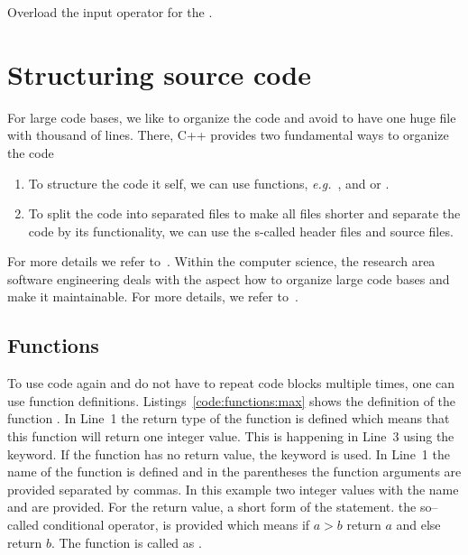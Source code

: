 \begin{exercise}
Overload the input operator \cpp{>>} for the .
\end{exercise}

\section{Structuring source code}
For large code bases, we like to organize the code and avoid to have one huge file with thousand of lines. There, C++ provides two fundamental ways to organize the code
\begin{enumerate}
\item To structure the code it self, we can use functions, \emph{e.g.}\ , and  or .
\item To split the code into separated files to make all files shorter and
separate the code by its functionality, we can use the s-called header files and source files.
\end{enumerate}
For more details we refer to~\cite[Chapter~4]{andrew2000accelerated}. Within the computer science, the research area software engineering deals with the aspect how to organize large code bases and make it maintainable. For more details, we refer to~\cite{hunt1900pragmatic,sommerville2011software}. 


\subsection{Functions}
\label{sec:functions}
To use code again and do not have to repeat code blocks multiple times, one can use function definitions. Listings~\ref{code:functions:max} shows the definition of the function . In Line~1 the return type  of the function is defined which means that this function will return one integer value. This is happening in Line~3 using the  keyword. If the function has no return value, the keyword  is used. In Line~1 the name of the function  is defined and in the parentheses the function arguments are provided separated by commas. In this example two integer values with the name  and  are provided. For the return value, a short form of the  statement. the so--called conditional operator, is provided which means if $a>b$ return $a$ and else return $b$. The function is called as .   \\

